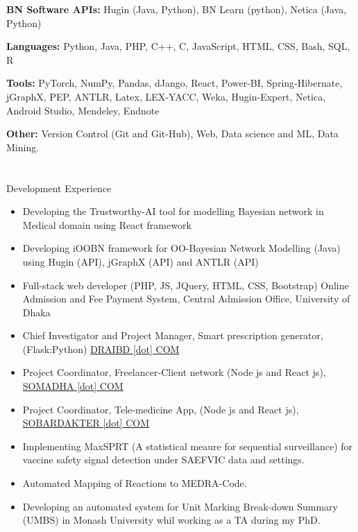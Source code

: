 \documentclass{my_cv}
\begin{document}
\textbf{BN Software APIs:} Hugin (Java, Python), BN Learn (python), Netica (Java, Python)

\noindent\textbf{Languages:} Python, Java, PHP, C++, C, JavaScript, HTML, CSS, Bash, SQL, R

\noindent\textbf{Tools:} PyTorch, NumPy, Pandas, dJango, React, Power-BI, Spring-Hibernate, jGraphX, PEP, ANTLR, Latex, LEX-YACC, Weka, Hugin-Expert, Netica, Android Studio, Mendeley, Endnote

\noindent\textbf{Other:} Version Control (Git and Git-Hub), Web, Data science and ML, Data Mining.

\section{\faBuilding}{Development Experience}
\begin{itemize}[noitemsep]
    \item Developing the Trustworthy-AI tool for modelling Bayesian network in Medical domain using React framework
    \item Developing iOOBN framework for OO-Bayesian Network Modelling (Java) using Hugin (API), jGraphX (API) and ANTLR (API)
    \item Full-stack web developer (PHP, JS, JQuery, HTML, CSS, Bootstrap)
Online Admission and Fee Payment System, Central Admission Office, University of Dhaka
    \item Chief Investigator and Project Manager, Smart prescription generator, (Flask:Python) \href{http://draibd.com}{DRAIBD [dot] COM}
    \item Project Coordinator, Freelancer-Client network (Node js and React js), \href{https://somadha.com}{SOMADHA [dot] COM}
    \item Project Coordinator, Tele-medicine App, (Node js and React js), \href{https://sobardakter.com}{SOBARDAKTER [dot] COM}
    \item Implementing MaxSPRT (A statistical meaure for sequential surveillance) for vaccine safety signal detection under SAEFVIC data and settings.
    \item Automated Mapping of Reactions to MEDRA-Code.
    \item Developing an automated system for Unit Marking Break-down Summary (UMBS) in Monash University whil working as a TA during my PhD.
\end{itemize}
\end{document}
